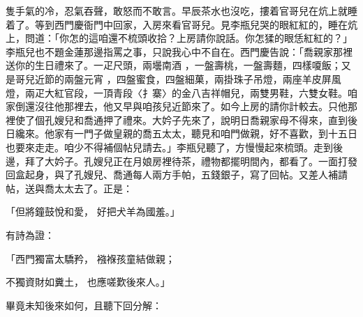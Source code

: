 隻手氣的冷，忍氣吞聲，敢怒而不敢言。早辰茶水也沒吃，摟着官哥兒在炕上就睡着了。等到西門慶衙門中回家，入房來看官哥兒。見李瓶兒哭的眼紅紅的，睡在炕上，問道：「你怎的這咱還不梳頭收拾？上房請你說話。你怎猱的眼恁紅紅的？」李瓶兒也不題金蓮那邊指罵之事，只說我心中不自在。西門慶告說：「喬親家那裡送你的生日禮來了。一疋尺頭，兩壜南酒 ，一盤壽桃，一盤壽麵，四樣嗄飯；又是哥兒近節的兩盤元宵 ，四盤蜜食，四盤細菓，兩掛珠子吊燈，兩座羊皮屏風燈，兩疋大紅官段，一頂青段〈扌寨〉的金八吉祥帽兒，兩雙男鞋，六雙女鞋。咱家倒還沒往他那裡去，他又早與咱孩兒近節來了。如今上房的請你計較去。只他那裡使了個孔嫂兒和喬通押了禮來。大妗子先來了，說明日喬親家母不得來，直到後日纔來。他家有一門子做皇親的喬五太太，聽見和咱門做親，好不喜歡，到十五日也要來走走。咱少不得補個帖兒請去。」李瓶兒聽了，方慢慢起來梳頭。走到後邊，拜了大妗子。孔嫂兒正在月娘房裡待茶，禮物都擺明間內，都看了。一面打發回盒起身，與了孔嫂兒、喬通每人兩方手帕，五錢銀子，寫了回帖。又差人補請帖，送與喬太太去了。正是：

「但將鐘鼓悅和愛，   好把犬羊為國羞。」

有詩為證：

「西門獨富太驕矜，   襁褓孩童結做親；

不獨資財如糞土，   也應嗟歎後來人。」

畢竟未知後來如何，且聽下回分解：

